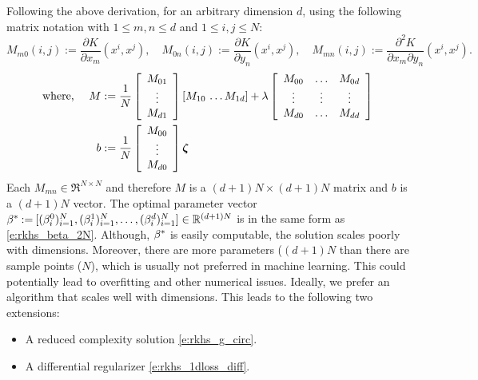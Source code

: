 Following the above derivation, for an arbitrary dimension $d$, using the following matrix notation with $1 \leq m,n \leq d$ and $1 \leq i,j \leq N$:
\[
M_{m0}(i,j) := \frac{\partial K}{\partial x_m}(x^i,x^j),
\quad 
M_{0n}(i,j) := \frac{\partial K}{\partial y_n}(x^i,x^j),
\quad
M_{mn}(i,j) := \frac{\partial^2 K}{\partial x_m \partial y_n}(x^i,x^j).
\]	
\begin{equation*}
\begin{aligned}
\text{where,
}
\quad
M & := \frac{1}{N} \left[\begin{array}{c} M_{01} \\ \vdots \\ M_{d1} \end{array}\right] [ M_{10} \, \hdots M_{1d}] + \lambda  \left[
\begin{array}{c c c}
M_{00}  & \hdots & M_{0d}\\
\vdots & \vdots &  \vdots \\
M_{d0} & \hdots & M_{dd}
\end{array}
\right] \\
b & :=  \frac{1}{N} \left[ \begin{array}{c} M_{00} \\ \vdots \\ M_{d0} \end{array}\right] \boldsymbol{\zeta}
\end{aligned}
\label{e:rkhs_beta_optimal}
\end{equation*}
Each $M_{mn} \in \Re^{N \times N}$ and therefore $M$ is a $(d+1) N \times (d+1) N$ matrix and $b$ is a $(d+1) N$ vector. The optimal parameter vector $\beta^* \mathbin{:=} [ (\beta^0_i)_{i=1}^N, (\beta^1_i)_{i=1}^N, \hdots, (\beta^d_i)_{i=1}^N] \in \mathbb{R}^{(d+1) N}$ is in the same form as \eqref{e:rkhs_beta_2N}. Although, $\beta^*$ is easily computable, the solution scales poorly with dimensions. 
Moreover, there are more parameters ($(d+1)N$ than there are sample points ($N$), which is usually not preferred in machine learning. This could potentially lead to overfitting and other numerical issues.   
Ideally, we prefer an algorithm that scales well with dimensions. This leads to the following two extensions:
\begin{itemize}
	\item A reduced complexity solution \eqref{e:rkhs_g_circ}.
	\item A differential regularizer \eqref{e:rkhs_1dloss_diff}.
\end{itemize}
